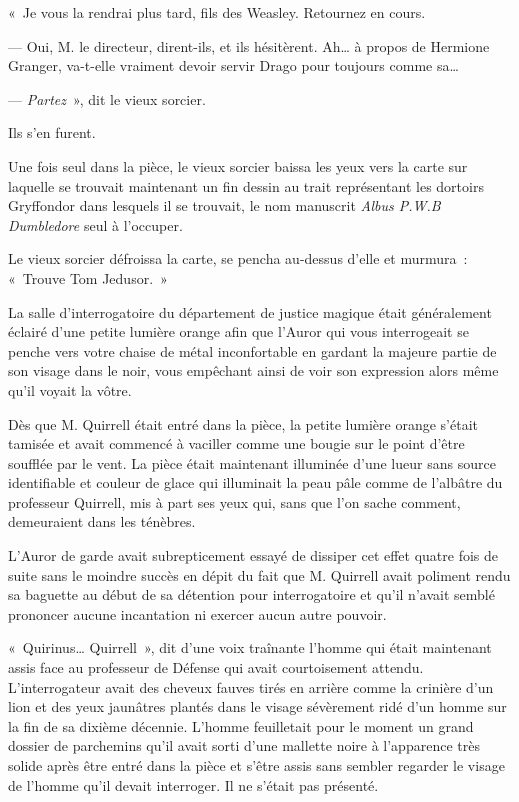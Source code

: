 «~Je vous la rendrai plus tard, fils des Weasley.
Retournez en cours.

--- Oui, M. le directeur, dirent-ils, et ils hésitèrent.
Ah… à propos de Hermione Granger, va-t-elle vraiment devoir servir Drago pour toujours comme sa…

--- \emph{Partez}~», dit le vieux sorcier.

Ils s'en furent.

Une fois seul dans la pièce, le vieux sorcier baissa les yeux vers la carte sur laquelle se trouvait maintenant un fin dessin au trait représentant les dortoirs Gryffondor dans lesquels il se trouvait, le nom manuscrit \emph{Albus P.W.B Dumbledore} seul à l'occuper.

Le vieux sorcier défroissa la carte, se pencha au-dessus d'elle et murmura~: «~Trouve Tom Jedusor.~»

\later

La salle d'interrogatoire du département de justice magique était généralement éclairé d'une petite lumière orange afin que l'Auror qui vous interrogeait se penche vers votre chaise de métal inconfortable en gardant la majeure partie de son visage dans le noir, vous empêchant ainsi de voir son expression alors même qu'il voyait la vôtre.

Dès que M. Quirrell était entré dans la pièce, la petite lumière orange s'était tamisée et avait commencé à vaciller comme une bougie sur le point d'être soufflée par le vent.
La pièce était maintenant illuminée d'une lueur sans source identifiable et couleur de glace qui illuminait la peau pâle comme de l'albâtre du professeur Quirrell, mis à part ses yeux qui, sans que l'on sache comment, demeuraient dans les ténèbres.

L'Auror de garde avait subrepticement essayé de dissiper cet effet quatre fois de suite sans le moindre succès en dépit du fait que M. Quirrell avait poliment rendu sa baguette au début de sa détention pour interrogatoire et qu'il n'avait semblé prononcer aucune incantation ni exercer aucun autre pouvoir.

«~Quirinus…
Quirrell~», dit d'une voix traînante l'homme qui était maintenant assis face au professeur de Défense qui avait courtoisement attendu.
L'interrogateur avait des cheveux fauves tirés en arrière comme la crinière d'un lion et des yeux jaunâtres plantés dans le visage sévèrement ridé d'un homme sur la fin de sa dixième décennie.
L'homme feuilletait pour le moment un grand dossier de parchemins qu'il avait sorti d'une mallette noire à l'apparence très solide après être entré dans la pièce et s'être assis sans sembler regarder le visage de l'homme qu'il devait interroger.
Il ne s'était pas présenté.

